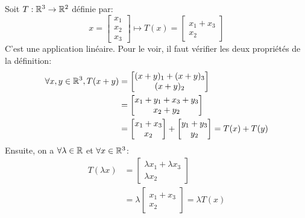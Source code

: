 Soit $T: \mathbb{R}^3 \to \mathbb{R}^2$ définie par:
$$x = \begin{bmatrix}
x_1 \\ x_2 \\ x_3
\end{bmatrix} \mapsto T(x) = 
\begin{bmatrix}
x_1 + x_3 \\ x_2
\end{bmatrix}$$
C'est une application linéaire. Pour le voir, il faut vérifier les deux propriétés de la définition:
\begin{align*}
    \forall x,y \in \mathbb{R}^3, T(x+y) &=
    \begin{bmatrix}
    (x+y)_1 + (x+y)_3 \\ (x+y)_2
    \end{bmatrix} \\
    &= \begin{bmatrix}
    x_1 + y_1 + x_3 + y_3 \\ x_2 + y_2
    \end{bmatrix} \\
    &= \begin{bmatrix}
    x_1 + x_3 \\ x_2
    \end{bmatrix} + \begin{bmatrix}
    y_1 + y_3 \\ y_2
    \end{bmatrix} 
    = T(x) + T(y)
\end{align*}
Ensuite, on a $\forall \lambda \in \mathbb{R}$ et $\forall x \in \mathbb{R}^3$:
\begin{align*}
    T(\lambda x) &= 
    \begin{bmatrix}
    \lambda x_1 + \lambda x_3 \\ \lambda x_2
    \end{bmatrix} \\ 
    &= \lambda \begin{bmatrix}
    x_1 + x_3 \\ x_2
    \end{bmatrix}
    = \lambda T(x)
\end{align*}

